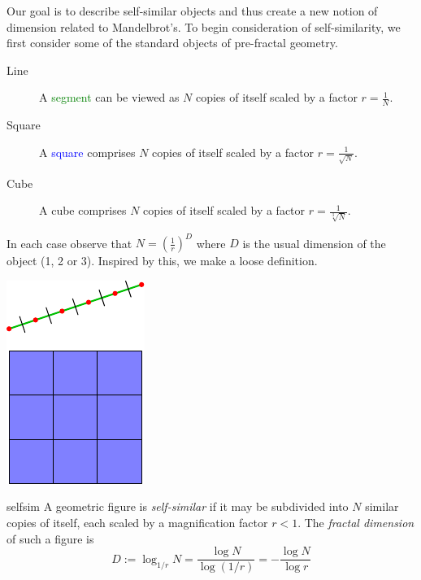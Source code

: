 Our goal is to describe self-similar objects and thus create a new notion of dimension related to Mandelbrot's. To begin consideration of self-similarity, we first consider some of the standard objects of pre-fractal geometry.\par
\begin{minipage}[t]{0.75\linewidth}\vspace{-5pt}
	\begin{description}
		\item[Line] A \textcolor{Green}{segment} can be viewed as $N$ copies of itself scaled by a factor $r=\frac 1N$.
		\item[Square] A \textcolor{blue}{square} comprises $N$ copies of itself scaled by a factor $r=\frac 1{\sqrt N}$.
		\item[Cube] A cube comprises $N$ copies of itself scaled by a factor $r=\frac 1{\sqrt[3]{N}}$.
	\end{description}\vspace{-5pt}
	In each case observe that $N=\left(\frac 1r\right)^D$ where $D$ is the usual dimension of the object (1, 2 or 3). Inspired by this, we make a loose definition.
\end{minipage}
\hfill
\begin{minipage}[t]{0.24\linewidth}\vspace{-15pt}
	\flushright\includegraphics[scale=0.95]{self-sim-line}
\end{minipage}


\begin{defn}{}{selfsim}
	A geometric figure is \emph{self-similar} if it may be subdivided into $N$ similar copies of itself, each scaled by a magnification factor $r<1$. The \emph{fractal dimension} of such a figure is
	\[
		D:=\log_{1/r}N=\frac{\log N}{\log (1/r)}=-\frac{\log N}{\log r}
	\]
\end{defn}


